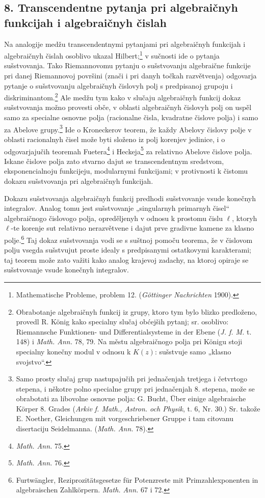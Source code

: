 \documentclass[11pt]{article}
\begin{document}
\subsection*{8. Transcendentne pytanja pri algebraičnyh funkcijah i algebraičnyh čislah}
Na analogije medžu transcendentnymi pytanjami pri algebraičnyh funkcijah i algebraičnyh čislah osoblivo ukazal Hilbert;\footnote{Mathematische Probleme, problem 12. (\emph{Göttinger Nachrichten} 1900).} v sučnosti ide o pytanja sušstvovanja. Tako Riemannovomu pytanju o sušstvovanju algebraične funkcije pri danej Riemannovoj površini (znači i pri danyh točkah razvětvenja) odgovarja pytanje o sušstvovanju algebraičnyh čislovyh polj s predpisanoj grupoju i diskriminantom.\footnote{Obrabotanje algebraičnyh funkcij iz grupy, ktoro tym bylo blizko predloženo, provedl R. König kako specialny slučaj obćejših pytanj; sr. osoblivo: Riemannsche Funktionen- und Differentialsysteme in der Ebene (\emph{J. f. M.} t. 148) i \emph{Math. Ann.} 78, 79. Na městu algebraičnogo polja pri Königu stoji specialny konečny modul v odnosu k \(K(z)\): sušstvuje samo „klasno svojstvo“.} Ale medžu tym kako v slučaju algebraičnyh funkcij dokaz sušstvovanja možno provesti obče, v oblasti algebraičnyh čislovyh polj on uspěl samo za specialne osnovne polja (racionalne čisla, kvadratne čislove polja) i samo za Abelove grupy.\footnote{Samo prosty slučaj grup nastupajučih pri jednačenjah tretjega i četvrtogo stepena, i někotre polno specialne grupy pri jednačenjah 8. stepena, može se obrabotati za libovolne osnovne polja: G. Bucht, Über einige algebraische Körper 8. Grades (\emph{Arkiv f. Math., Astron. och Physik}, t. 6, Nr. 30.) Sr. takože E. Noether, Gleichungen mit vorgeschriebener Gruppe i tam citovanu disertaciju Seidelmanna. (\emph{Math. Ann.} 78).} Ide o Kroneckerov teorem, že každy Abelovy čislovy polje v oblasti racionalnyh čisel može byti složeno iz polj korenjev jedinice, i o odgovarjajučih teoremah Fuetera\footnote{\emph{Math. Ann.} 75.} i Heckeja\footnote{\emph{Math. Ann.} 76.} za relativno Abelove čislove polja. Iskane čislove polja zato stvarno dajut se transcendentnym sredstvom, eksponencialnoju funkcijeju, modularnymi funkcijami; v protivnosti k čistomu dokazu sušstvovanja pri algebraičnyh funkcijah.

Dokazu sušstvovanja algebraičnyh funkcij predhodi sušstvovanje vsude konečnyh integralov. Analog tomu jest sušstvovanje „singularnyh primarnyh čisel“ algebraičnogo čislovogo polja, opreděljenyh v odnosu k prostomu čislu \(\ell\), ktoryh \(\ell\)-te korenje sut relativno nerazvětvene i dajut prve gradivne kamene za klasno polje.\footnote{Furtwängler, Reziprozitätsgesetze für Potenzreste mit Primzahlexponenten in algebraischen Zahlkörpern. \emph{Math. Ann.} 67 i 72.} Taj dokaz sušstvovanja vodi se s suštnoj pomoču teorema, že v čislovom polju vsegda sušstvujut proste idealy s predpisanymi ostatkovymi karakterami; taj teorem može zato važiti kako analog krajevoj zadachy, na ktoroj opiraje se sušstvovanje vsude konečnyh integralov.
\end{document}
